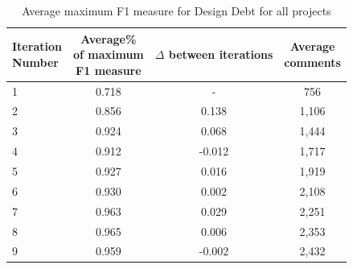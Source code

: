 \begin{table}[!thb]
    \begin{center}
        \caption{Average maximum F1 measure for Design Debt  for all projects}
        \label{tbl:design_iteration_performance}
        \begin{tabular}{l| c c c}
        \toprule
        \thead{Iteration\\Number} & \thead{Average\%\\of maximum\\F1 measure} & \thead{$\Delta$\\between\\iterations} & \thead{Average\\comments} \\
        \midrule
         1  &  0.718 &  -      & 756   \\  
         2  &  0.856 & 0.138   & 1,106 \\  
         3  &  0.924 & 0.068   & 1,444 \\  
         4  &  0.912 & -0.012  & 1,717 \\  
         5  &  0.927 & 0.016   & 1,919 \\  
         6  &  0.930 & 0.002   & 2,108 \\  
         7  &  0.963 & 0.029   & 2,251 \\  
         8  &  0.965 & 0.006   & 2,353 \\  
         9  &  0.959 & -0.002  & 2,432 \\  
        \bottomrule
        \end{tabular}
    \end{center}    
\end{table}

